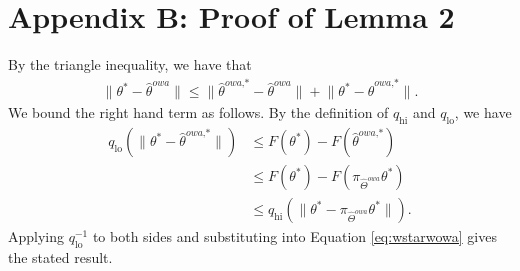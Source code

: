 \documentclass[twoside]{article}
\newcommand{\qhi}{q_\text{hi}}
\newcommand{\qlo}{q_\text{lo}}
\newcommand{\W}{{\hat \Theta^{\textit{owa}}}}
\newcommand{\w}{\theta}
\newcommand{\wowa}{\hat\w^{owa}}
\newcommand{\wowastar}{\hat\w^{\textit{owa,*}}}
\newcommand{\wstar}{{\w^{*}}}
\newcommand{\ltwo}[1]{{\lVert {#1} \rVert}}
\newcommand{\proj}[1]{\pi_{{#1}}}
\begin{document}

\section*{Appendix B: Proof of Lemma 2}
By the triangle inequality, we have that
\begin{align}
\ltwo{\wstar-\wowa}
\le
\ltwo{\wowastar-\wowa}
+
\ltwo{\wstar-\wowastar}
.
\label{eq:wstarwowa}
\end{align}
We bound the right hand term as follows.
By the definition of $\qhi$ and $\qlo$, we have
\begin{align}
\qlo \left( \ltwo {\wstar-\wowastar} \right)
&\le F(\wstar) - F(\wowastar)
\\
&\le F(\wstar) - F(\proj\W\wstar)
\\
&\le \qhi \left( \ltwo {\wstar - \proj\W\wstar} \right)
.
\end{align}
Applying $\qlo^{-1}$ to both sides and substituting into Equation \ref{eq:wstarwowa} gives the stated result.
\end{document}
